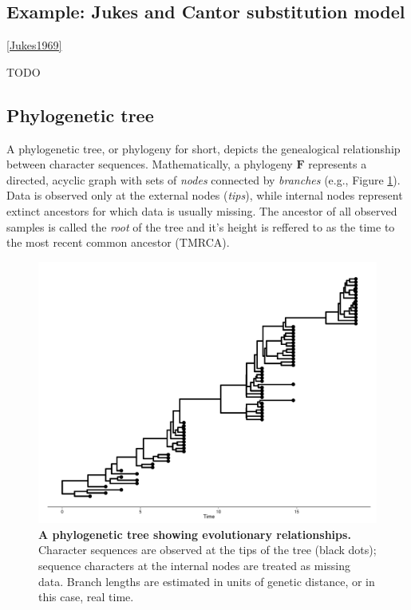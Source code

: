 \documentclass[12pt,twoside]{mitthesis}
\theoremstyle{plain}
\theoremstyle{definition}
\theoremstyle{remark}
\begin{document}
\subsection{Example: Jukes and Cantor substitution model\label{sub:jc69}}

\ref{Jukes1969}

TODO

\subsection{Phylogenetic tree}

A phylogenetic tree, or phylogeny for short, depicts the genealogical relationship between character sequences.
Mathematically, a phylogeny $\mathbf{F}$ represents a directed, acyclic graph with sets of \emph{nodes} connected by \emph{branches} (e.g., Figure \ref{fig:treeconcept}).
Data is observed only at the external nodes (\emph{tips}), while internal nodes represent extinct ancestors for which data is usually missing.
The ancestor of all observed samples is called the \emph{root} of the tree and it's height is reffered to as the time to the most recent common ancestor (TMRCA).

\begin{figure}[H]
\begin{center}
\includegraphics[scale=0.35]{treeconcept} 
\end{center}
\caption{{ \footnotesize {\bf A phylogenetic tree showing evolutionary relationships.} 
Character sequences are observed at the tips of the tree (black dots); sequence characters at the internal nodes are treated as missing data. 
Branch lengths are estimated in units of genetic distance, or in this case, real time.
}}
\label{fig:treeconcept}
\end{figure}
\end{document}

